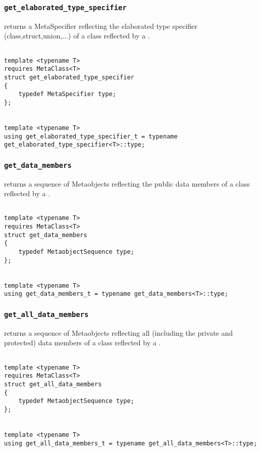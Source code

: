 
\subsubsection{\texttt{get\_elaborated\_type\_specifier}}

returns a MetaSpecifier reflecting the elaborated type specifier (class,struct,union,...) of a class reflected by a .

\begin{verbatim}

template <typename T>
requires MetaClass<T>
struct get_elaborated_type_specifier
{
	typedef MetaSpecifier type;
};


template <typename T>
using get_elaborated_type_specifier_t = typename get_elaborated_type_specifier<T>::type;

\end{verbatim}

\subsubsection{\texttt{get\_data\_members}}

returns a sequence of Metaobjects reflecting the public data members of a class reflected by a .

\begin{verbatim}

template <typename T>
requires MetaClass<T>
struct get_data_members
{
	typedef MetaobjectSequence type;
};


template <typename T>
using get_data_members_t = typename get_data_members<T>::type;

\end{verbatim}

\subsubsection{\texttt{get\_all\_data\_members}}

returns a sequence of Metaobjects reflecting all    (including the private and protected)   data members of a class reflected by a .

\begin{verbatim}

template <typename T>
requires MetaClass<T>
struct get_all_data_members
{
	typedef MetaobjectSequence type;
};


template <typename T>
using get_all_data_members_t = typename get_all_data_members<T>::type;

\end{verbatim}
